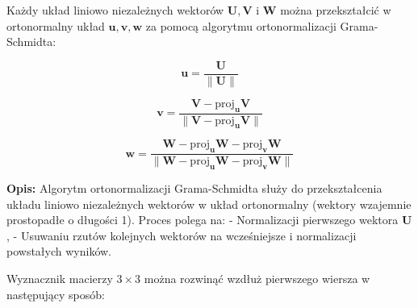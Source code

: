 \vspace{1em}
\noindent
Każdy układ liniowo niezależnych wektorów \( \mathbf{U}, \mathbf{V} \) i \( \mathbf{W} \) można przekształcić w ortonormalny układ \( \mathbf{u}, \mathbf{v}, \mathbf{w} \) za pomocą algorytmu ortonormalizacji Grama-Schmidta:

\[
\mathbf{u} = \frac{\mathbf{U}}{\|\mathbf{U}\|}
\]

\[
\mathbf{v} = \frac{\mathbf{V} - \text{proj}_{\mathbf{u}} \mathbf{V}}{\|\mathbf{V} - \text{proj}_{\mathbf{u}} \mathbf{V}\|}
\]

\[
\mathbf{w} = \frac{\mathbf{W} - \text{proj}_{\mathbf{u}} \mathbf{W} - \text{proj}_{\mathbf{v}} \mathbf{W}}{\|\mathbf{W} - \text{proj}_{\mathbf{u}} \mathbf{W} - \text{proj}_{\mathbf{v}} \mathbf{W}\|}
\]

\vspace{1em}
\noindent
\textbf{Opis:} Algorytm ortonormalizacji Grama-Schmidta służy do przekształcenia układu liniowo niezależnych wektorów w układ ortonormalny (wektory wzajemnie prostopadłe o długości 1). Proces polega na:
- Normalizacji pierwszego wektora \( \mathbf{U} \),
- Usuwaniu rzutów kolejnych wektorów na wcześniejsze i normalizacji powstałych wyników.








\vspace{1em}
\noindent
Wyznacznik macierzy \( 3 \times 3 \) można rozwinąć wzdłuż pierwszego wiersza w następujący sposób:

